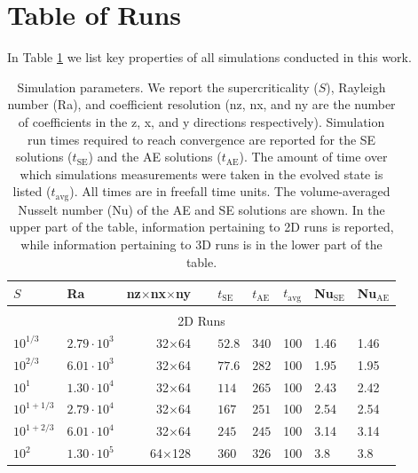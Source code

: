 \documentclass[aps, pre, onecolumn, nofootinbib, notitlepage, groupedaddress, amsfonts, amssymb, amsmath, longbibliography]{revtex4-1}
\begin{document}
\appendix
\section{Table of Runs}
\label{appendix:run_table}
In Table \ref{table:run_parameters} we list key properties of all simulations
conducted in this work.  
\begin{table}
\caption{Simulation parameters. We report the supercriticality ($S$), Rayleigh number (Ra), 
and coefficient resolution (nz, nx, and ny are the number of coefficients in the
z, x, and y directions respectively).
Simulation run times required to reach convergence
are reported for the SE solutions ($t_{\text{SE}}$) and the AE solutions ($t_{\text{AE}}$).
The amount of time over which simulations measurements were taken in the evolved
state is listed ($t_{\text{avg}}$). All times are in freefall time units.  
The volume-averaged Nusselt number (Nu) of the
AE and SE solutions are shown.
In the upper part of the table, information pertaining to 2D runs is reported,
while information pertaining to 3D runs is in the lower part of the table.
}
\label{table:run_parameters}
\begin{center}
\begin{tabularx}{\textwidth}{ X X r | X X X | X X }
\hline																	
$S$	&	Ra	&	nz$\times$nx$\times$ny$\,\,\,\,\,\,\,$	&	$t_{\text{SE}}$	&	$t_{\text{AE}}$	&	$t_{\text{avg}}$	&	Nu$_{\text{SE}}$	&	Nu$_{\text{AE}}$	\\
\hline \hline \multicolumn{8}{c}{\vspace{-0.2cm}}\\
\multicolumn{8}{c}{\vspace{0.1cm}2D Runs} \\
\hline
$10^{1/3}$	    &	$2.79 \cdot 10^3$       &	32$\times$64$\,\,\,\,\,\,\,$&	$52.8$	&	$340$	&	100	&	1.46	&	1.46	\\
$10^{2/3}$	    &	$6.01 \cdot 10^3$       &	32$\times$64$\,\,\,\,\,\,\,$&	$77.6$	&	$282$	&	100	&	1.95	&	1.95	\\
$10^1$	        &	$1.30 \cdot 10^4$       &  	32$\times$64$\,\,\,\,\,\,\,$&	$114$	&	$265$	&	100	&	2.43	&	2.42	\\
$10^{1 + 1/3}$	&	$2.79 \cdot 10^4$       &	32$\times$64$\,\,\,\,\,\,\,$&	$167$	&	$251$	&	100	&	2.54	&	2.54	\\
$10^{1 + 2/3}$	&	$6.01 \cdot 10^4$       &	32$\times$64$\,\,\,\,\,\,\,$&	$245$	&	$245$	&	100	&	3.14	&	3.14	\\
$10^2$	        &	$1.30 \cdot 10^5$       &	64$\times$128$\,\,\,\,\,\,\,$&	$360$	&	$326$	&	100	&	3.8	&	3.8	\\

\end{tabularx}
\end{center}
\end{table}
\end{document}
